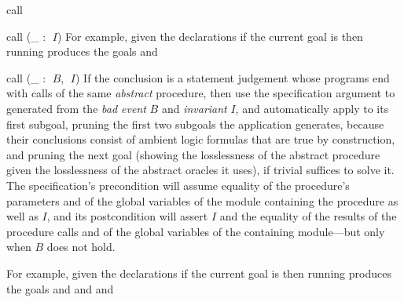 \begin{tactic}{call}
\begin{tsyntax}{call (_ : $\;I$)}
    \medskip
    For example, given the declarations
    if the current goal is
    then running
    produces the goals
     and
  \end{tsyntax}

  \begin{tsyntax}{call (_ : $\;B$, $\;I$)}
    If the conclusion is a \prhl statement judgement whose programs
    end with calls of the same \emph{abstract} procedure, then use the
    specification argument to  generated from the \emph{bad
      event} $B$ and \emph{invariant} $I$, and automatically apply
     to its first subgoal, pruning the first two
    subgoals the application generates, because their conclusions
    consist of ambient logic formulas that are true by construction,
    and pruning the next goal (showing the losslessness of the abstract
    procedure given the losslessness of the abstract oracles it uses), if
    trivial suffices to solve it.
    The specification's precondition will assume equality of the
    procedure's parameters and of the global variables of the module
    containing the procedure as well as $I$, and its postcondition
    will assert $I$ and the equality of the results of the procedure
    calls and of the global variables of the containing module---but
    only when $B$ does not hold.

    \medskip
    For example, given the declarations
    if the current goal is
    then running
    produces the goals
     and
     and
     and
  \end{tsyntax}


\end{tactic}
